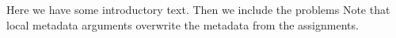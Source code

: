 \begin{assignment}[title=Introduction,given=April 24.,due=May 03.]
  Here we have some introductory text. Then we include the problems
  Note that local metadata arguments overwrite the metadata from the assignments.
\end{assignment}


